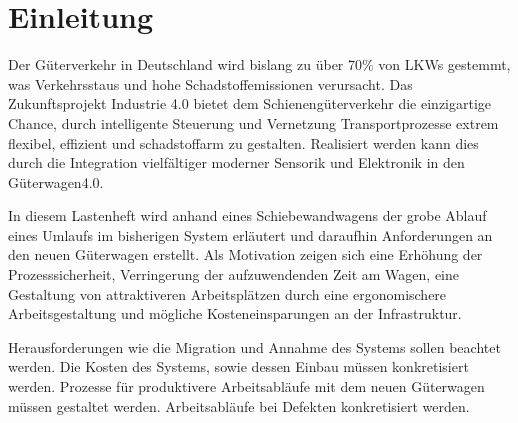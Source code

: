 \section{Einleitung}
Der Güterverkehr in Deutschland wird bislang zu über 70\% von LKWs gestemmt, was Verkehrsstaus und hohe Schadstoffemissionen verursacht. Das Zukunftsprojekt Industrie 4.0 bietet dem Schienengüterverkehr die einzigartige Chance, durch intelligente Steuerung und Vernetzung Transportprozesse extrem flexibel, effizient und schadstoffarm zu gestalten. Realisiert werden kann dies durch die Integration vielfältiger moderner Sensorik und Elektronik in den Güterwagen4.0.\cite{AZAP}\par
In diesem Lastenheft wird anhand eines Schiebewandwagens der grobe Ablauf eines Umlaufs im bisherigen System erläutert und daraufhin Anforderungen an den neuen Güterwagen erstellt. Als Motivation zeigen sich %
eine Erhöhung der Prozesssicherheit, Verringerung der aufzuwendenden Zeit am Wagen, eine Gestaltung von attraktiveren Arbeitsplätzen durch eine ergonomischere Arbeitsgestaltung und mögliche Kosteneinsparungen an der Infrastruktur.\par
Herausforderungen wie die Migration und Annahme des Systems sollen beachtet werden. Die Kosten des Systems, sowie dessen Einbau müssen konkretisiert werden. Prozesse für produktivere Arbeitsabläufe mit dem neuen Güterwagen müssen gestaltet werden. Arbeitsabläufe bei Defekten konkretisiert werden.\\

